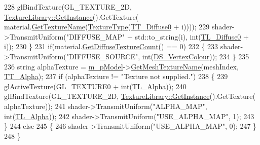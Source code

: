 \begin{DoxyCode}
228       glBindTexture(GL\_TEXTURE\_2D, \hyperlink{class_singleton_a74f32751d99bf3cc95fe17aba11f4b07}{TextureLibrary::GetInstance}().GetTexture(
      material.\hyperlink{class_material_a75ffaeede8e8cd976e8be44185a97953}{GetTextureName}(\hyperlink{_material_8h_a65468556d79304b3a4bfc464cc12e549}{TextureType}(\hyperlink{_material_8h_a65468556d79304b3a4bfc464cc12e549a930f237c6d8e17be231333de7101cd87}{TT\_Diffuse0} + i))));
229       shader->TransmitUniform(\textcolor{stringliteral}{"DIFFUSE\_MAP"} + std::to\_string(i), \textcolor{keywordtype}{int}(\hyperlink{_renderable_object_8h_a73712b1b23911f45e8325b203e78a066ab1df4354fa133fc996d2f179c748b202}{TL\_Diffuse0} + i));
230     \}
231     \textcolor{keywordflow}{if}(material.\hyperlink{class_material_a11e5c7f30a1b4aaf465eb611c4d2baa2}{GetDiffuseTextureCount}() == 0)
232     \{
233       shader->TransmitUniform(\textcolor{stringliteral}{"DIFFUSE\_SOURCE"}, \textcolor{keywordtype}{int}(\hyperlink{_renderable_object_8h_a650ae6a29421b549c3c3a65cee51f41bad5f372930a480f8a177faf3bfaa22f2b}{DS\_VertexColour}));
234     \}
235 
236     \textcolor{keywordtype}{string} alphaTexture = \hyperlink{class_renderable_object_aab96dcc31d9e748645868c9449ae8cb6}{m\_pModel}->\hyperlink{class_model_a431c226c7b320ac663925784097b9be8}{GetMeshTextureName}(meshIndex, 
      \hyperlink{_material_8h_a65468556d79304b3a4bfc464cc12e549a910fc22c8e04281e120beb6222bdfcd3}{TT\_Alpha});
237     \textcolor{keywordflow}{if} (alphaTexture != \textcolor{stringliteral}{"Texture not supplied."})
238     \{
239       glActiveTexture(GL\_TEXTURE0 + \textcolor{keywordtype}{int}(\hyperlink{_renderable_object_8h_a73712b1b23911f45e8325b203e78a066a383b11d877cda42bf97f7e4b8b4ae9eb}{TL\_Alpha}));
240       glBindTexture(GL\_TEXTURE\_2D, \hyperlink{class_singleton_a74f32751d99bf3cc95fe17aba11f4b07}{TextureLibrary::GetInstance}().GetTexture(
      alphaTexture));
241       shader->TransmitUniform(\textcolor{stringliteral}{"ALPHA\_MAP"}, \textcolor{keywordtype}{int}(\hyperlink{_renderable_object_8h_a73712b1b23911f45e8325b203e78a066a383b11d877cda42bf97f7e4b8b4ae9eb}{TL\_Alpha}));
242       shader->TransmitUniform(\textcolor{stringliteral}{"USE\_ALPHA\_MAP"}, 1);
243     \}
244     \textcolor{keywordflow}{else}
245     \{
246       shader->TransmitUniform(\textcolor{stringliteral}{"USE\_ALPHA\_MAP"}, 0);
247     \}
248 \}
\end{DoxyCode}


